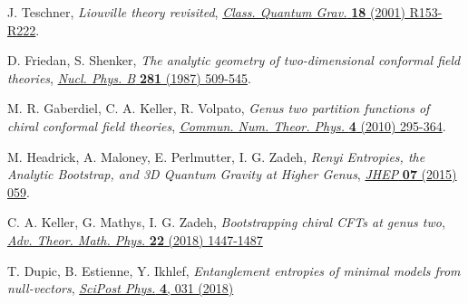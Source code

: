 \documentclass[a4paper,11pt]{article}
\begin{document}
\begin{thebibliography}{99}
 J. Teschner, \emph{Liouville theory revisited}, \href{https://doi.org/10.1088/0264-9381/18/23/201}{\emph{Class. Quantum Grav.} {\bf 18} (2001) R153-R222}.

 D. Friedan, S. Shenker, \emph{The analytic geometry of two-dimensional conformal field theories}, \href{https://doi.org/10.1016/0550-3213(87)90418-4}{\emph{Nucl. Phys. B} {\bf 281} (1987) 509-545}.

 M. R. Gaberdiel, C. A. Keller, R. Volpato, \emph{Genus two partition functions of chiral conformal field theories},
\href{https://dx.doi.org/10.4310/CNTP.2010.v4.n2.a2}{\emph{Commun. Num. Theor. Phys.} {\bf 4} (2010) 295-364}.

 M. Headrick, A. Maloney, E. Perlmutter, I. G. Zadeh, \emph{Renyi Entropies, the Analytic Bootstrap, and 3D Quantum Gravity at Higher Genus}, \href{https://doi.org/10.1007/JHEP07(2015)059}{\emph{JHEP} {\bf 07} (2015) 059}.

 C. A. Keller, G. Mathys, I. G. Zadeh, \emph{Bootstrapping chiral CFTs at genus two},
\href{https://dx.doi.org/10.4310/ATMP.2018.v22.n6.a3}{\emph{Adv. Theor. Math. Phys.} {\bf 22} (2018) 1447-1487}

 T. Dupic, B. Estienne, Y. Ikhlef, \emph{Entanglement entropies of minimal models from null-vectors}, 
\href{https://scipost.org/10.21468/SciPostPhys.4.6.031}{\emph{SciPost Phys.} {\bf 4}, 031 (2018)}





\end{thebibliography}
\end{document}
